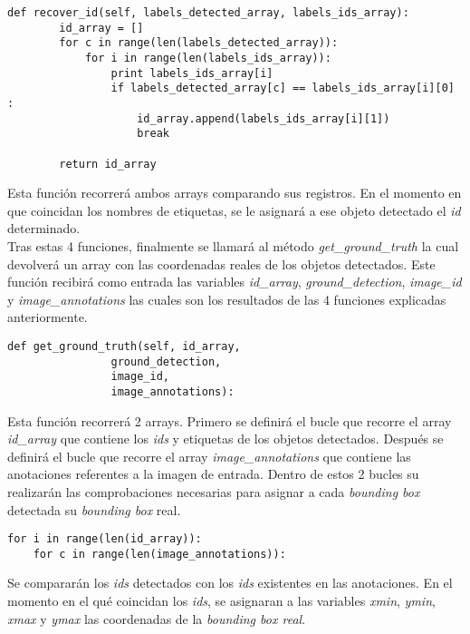 \documentclass[a4paper, 12pt, spanish, chapterprefix, numbers=noenddot]{book}
\begin{document}
\begin{lstlisting}[frame=single]
    def recover_id(self, labels_detected_array, labels_ids_array):
        id_array = []
        for c in range(len(labels_detected_array)):
            for i in range(len(labels_ids_array)):
                print labels_ids_array[i]
                if labels_detected_array[c] == labels_ids_array[i][0] :
                    id_array.append(labels_ids_array[i][1])
                    break

        return id_array
\end{lstlisting}

Esta función recorrerá ambos arrays comparando sus registros. En el momento en que coincidan los nombres de etiquetas, se le asignará a ese objeto detectado el \textit{id} determinado.\\

Tras estas 4 funciones, finalmente se llamará al método \textit{get\_ground\_truth} la cual devolverá un array con las coordenadas reales de los objetos detectados. Este función recibirá como entrada las variables \textit{id\_array}, \textit{ground\_detection}, \textit{image\_id} y \textit{image\_annotations} las cuales son los resultados de las 4 funciones explicadas anteriormente.\\

\begin{lstlisting}[frame=single]
def get_ground_truth(self, id_array,
				ground_detection,
				image_id,
				image_annotations):
\end{lstlisting}

Esta función recorrerá 2 arrays. Primero se definirá el bucle que recorre el array \textit{id\_array} que contiene los \textit{ids} y etiquetas de los objetos detectados. Después se definirá el bucle que recorre el array \textit{image\_annotations} que contiene las anotaciones referentes a la imagen de entrada. Dentro de estos 2 bucles su realizarán las comprobaciones necesarias para asignar a cada \textit{bounding box} detectada su \textit{bounding box} real.\\

\begin{lstlisting}[frame=single]
for i in range(len(id_array)):
	for c in range(len(image_annotations)):
\end{lstlisting}

Se compararán los \textit{ids} detectados con los \textit{ids} existentes en las anotaciones. En el momento en el qué coincidan los \textit{ids}, se asignaran a las variables \textit{xmin}, \textit{ymin}, \textit{xmax} y \textit{ymax} las coordenadas de la \textit{bounding box real}.\\
\end{document}
